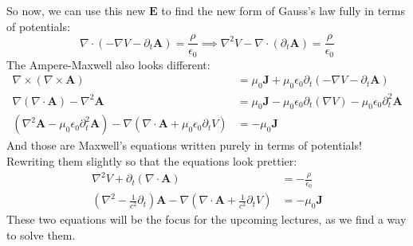 So now, we can use this new \( \mathbf{E} \) to find the new form of Gauss's law fully in terms of
potentials:
\[
	\nabla \cdot (-\nabla V - \partial_t \mathbf{A}) = \frac{\rho}{\epsilon_0} \implies \nabla^2 V - \nabla
	\cdot(\partial_t \mathbf{A}) = \frac{\rho}{\epsilon_0}
\]
The Ampere-Maxwell also looks different:
\begin{align*}
	\nabla \times(\nabla \times \mathbf{A}) &= \mu_0 \mathbf{J} + \mu_0 \epsilon_0 \partial_t(-\nabla V -
	\partial_t \mathbf{A})\\
	\nabla (\nabla \cdot \mathbf{A}) - \nabla^2 \mathbf{A} &= \mu_0 \mathbf{J} - \mu_0 \epsilon_0 \partial_t
	(\nabla V) - \mu_0 \epsilon_0 \partial_t^2 \mathbf{A}\\
	(\nabla^2 \mathbf{A} - \mu_0 \epsilon_0 \partial_t^2 \mathbf{A}) - \nabla\left( \nabla \cdot \mathbf{A} +
	\mu_0 \epsilon_0 \partial_t V\right) &= -\mu_0 \mathbf{J} 
\end{align*}
And those are Maxwell's equations written purely in terms of potentials! Rewriting them slightly so that the
equations look prettier: 
\begin{align}
	\label{17:potential1}\nabla^2 V + \partial_t(\nabla \cdot \mathbf{A}) &= -\frac{\rho}{\epsilon_0} \\ 
	\label{17:potential2}
	\left( \nabla^2 - \frac{1}{c^2}\partial_t \right)\mathbf{A} - \nabla\left(\nabla \cdot \mathbf{A} +
	\frac{1}{c^2} \partial_t V\right) &= -\mu_0 \mathbf{J}
\end{align}
These two equations will be the
focus for the upcoming lectures, as we find a way to solve them. 







